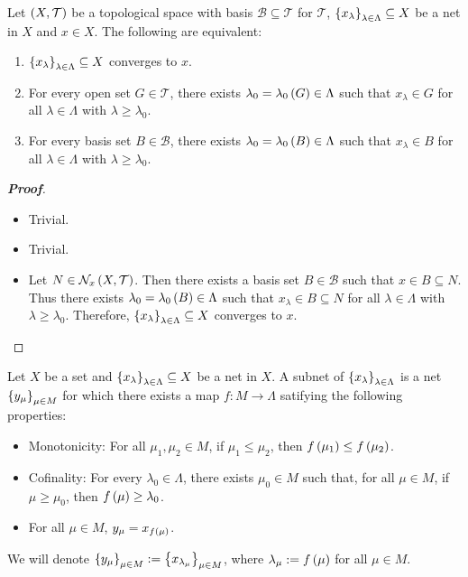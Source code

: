 \begin{proposition}
  Let $\left(X,\mathcal{T}\right)$ be a topological space with basis $\mathcal{B}\subseteq\mathcal{T}$ for $\mathcal{T}$, $\left\{x_\lambda\right\}_{\lambda\in\Lambda}\subseteq X$ be a net in $X$ and $x\in X$. The following are equivalent:

  \begin{enumerate}
    \item  $\left\{x_\lambda\right\}_{\lambda\in\Lambda}\subseteq X$ converges to $x$.
    \item For every open set $G\in\mathcal{T}$, there exists $\lambda_0=\lambda_0\left(G\right)\in\Lambda$ such that $x_\lambda\in G$ for all $\lambda\in\Lambda$ with $\lambda\geq\lambda_0$.
    \item For every basis set $B\in\mathcal{B}$, there exists $\lambda_0=\lambda_0\left(B\right)\in\Lambda$ such that $x_\lambda\in B$ for all $\lambda\in\Lambda$ with $\lambda\geq\lambda_0$.
  \end{enumerate}
  \begin{proof}[\rm\textbf{Proof}]
    \hfill
    \begin{itemize}
      \item[\boxed{1\Rightarrow2}] Trivial.
      \item[\boxed{2\Rightarrow3}] Trivial.
      \item[\boxed{3\Rightarrow1}] Let $N\in\mathcal{N}_x\left(X,\mathcal{T}\right)$. Then there exists a basis set $B\in\mathcal{B}$ such that $x\in B\subseteq N$. Thus there exists $\lambda_0=\lambda_0\left(B\right)\in\Lambda$ such that $x_\lambda\in B\subseteq N$ for all $\lambda\in\Lambda$ with $\lambda\geq\lambda_0$. Therefore, $\left\{x_\lambda\right\}_{\lambda\in\Lambda}\subseteq X$ converges to $x$.
    \end{itemize}
  \end{proof}
\end{proposition}

\begin{definition}
  Let $X$ be a set and $\left\{x_\lambda\right\}_{\lambda\in\Lambda}\subseteq X$ be a net in $X$. A subnet of $\left\{x_\lambda\right\}_{\lambda\in\Lambda}$ is a net $\left\{y_\mu\right\}_{\mu\in M}$ for which there exists a map $f:M\rightarrow\Lambda$ satifying the following properties:

  \begin{itemize}
    \item Monotonicity: For all $\mu_1,\mu_2\in M$, if $\mu_1\leq\mu_2$, then $f\left(\mu_1\right)\leq f\left(\mu_2\right)$.
    \item Cofinality: For every $\lambda_0\in\Lambda$, there exists $\mu_0\in M$ such that, for all $\mu\in M$, if $\mu\geq \mu_0$, then $f\left(\mu\right)\geq\lambda_0$.
    \item For all $\mu\in M$, $y_\mu=x_{f\left(\mu\right)}$.
  \end{itemize}

  We will denote $\left\{y_\mu\right\}_{\mu\in M}:=\left\{x_{\lambda_\mu}\right\}_{\mu\in M}$, where $\lambda_\mu:=f\left(\mu\right)$ for all $\mu\in M$.
\end{definition}

